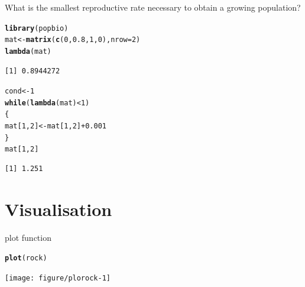 \documentclass[10pt]{beamer}\usepackage[]{graphicx}\usepackage[]{color}
\makeatletter
\newcommand{\hlnum}[1]{\textcolor[rgb]{0.686,0.059,0.569}{#1}}%
\newcommand{\hlopt}[1]{\textcolor[rgb]{0,0,0}{#1}}%
\newcommand{\hlstd}[1]{\textcolor[rgb]{0.345,0.345,0.345}{#1}}%
\newcommand{\hlkwa}[1]{\textcolor[rgb]{0.161,0.373,0.58}{\textbf{#1}}}%
\newcommand{\hlkwb}[1]{\textcolor[rgb]{0.69,0.353,0.396}{#1}}%
\newcommand{\hlkwc}[1]{\textcolor[rgb]{0.333,0.667,0.333}{#1}}%
\newcommand{\hlkwd}[1]{\textcolor[rgb]{0.737,0.353,0.396}{\textbf{#1}}}%
\newenvironment{kframe}{%
 \def\at@end@of@kframe{}%
 \ifinner\ifhmode%
  \def\at@end@of@kframe{\end{minipage}}%
  \begin{minipage}{\columnwidth}%
 \fi\fi%
 \def\FrameCommand##1{\hskip\@totalleftmargin \hskip-\fboxsep
 \colorbox{shadecolor}{##1}\hskip-\fboxsep
     \hskip-\linewidth \hskip-\@totalleftmargin \hskip\columnwidth}%
 \MakeFramed {\advance\hsize-\width
   \@totalleftmargin\z@ \linewidth\hsize
   \@setminipage}}%
 {\par\unskip\endMakeFramed%
 \at@end@of@kframe}
\newenvironment{knitrout}{}{} %
\makeatother
\begin{document}
\begin{frame}[fragile]{What is the smallest reproductive rate necessary to obtain a growing population?}
\begin{knitrout}
\color{fgcolor}\begin{kframe}
\begin{alltt}
\hlkwd{library}\hlstd{(popbio)}
\hlstd{mat} \hlkwb{<-} \hlkwd{matrix}\hlstd{(}\hlkwd{c}\hlstd{(}\hlnum{0}\hlstd{,}\hlnum{0.8}\hlstd{,}\hlnum{1}\hlstd{,}\hlnum{0}\hlstd{),} \hlkwc{nrow} \hlstd{=} \hlnum{2}\hlstd{)}
\hlkwd{lambda}\hlstd{(mat)}
\end{alltt}
\begin{verbatim}
[1] 0.8944272
\end{verbatim}
\begin{alltt}
\hlstd{cond} \hlkwb{<-} \hlnum{1}
\hlkwa{while}\hlstd{(}\hlkwd{lambda}\hlstd{(mat)} \hlopt{<} \hlnum{1} \hlstd{)}
\hlstd{\{}
  \hlstd{mat[}\hlnum{1}\hlstd{,}\hlnum{2}\hlstd{]} \hlkwb{<-} \hlstd{mat[}\hlnum{1}\hlstd{,}\hlnum{2}\hlstd{]}\hlopt{+}\hlnum{0.001}
\hlstd{\}}
\hlstd{mat[}\hlnum{1}\hlstd{,}\hlnum{2}\hlstd{]}
\end{alltt}
\begin{verbatim}
[1] 1.251
\end{verbatim}
\end{kframe}
\end{knitrout}

\end{frame}


\section{Visualisation}

\begin{frame}[fragile]{plot function}

\begin{knitrout}
\color{fgcolor}\begin{kframe}
\begin{alltt}
\hlkwd{plot}\hlstd{(rock)}
\end{alltt}
\end{kframe}
\texttt{[image: figure/plorock-1]} 

\end{knitrout}

\end{frame}

\end{document}
